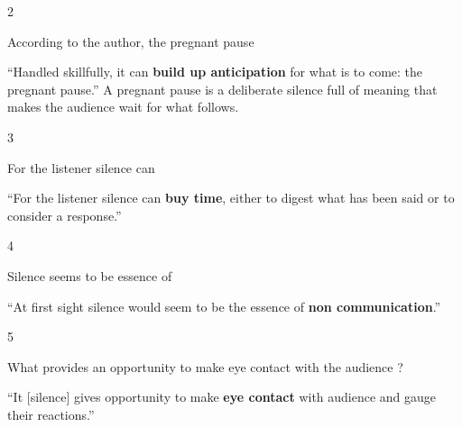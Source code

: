 \begin{question}{2}
{According to the author, the pregnant pause\par}
\begin{explain}
``Handled skillfully, it can \textbf{build up anticipation} for what is to come: the pregnant pause.'' A pregnant pause is a deliberate silence full of meaning that makes the audience wait for what follows.
\end{explain}
\end{question}

\begin{question}{3}
{For the listener silence can\par}
\begin{explain}
``For the listener silence can \textbf{buy time}, either to digest what has been said or to consider a response.''
\end{explain}
\end{question}

\begin{question}{4}
{Silence seems to be essence of\par}
\begin{explain}
``At first sight silence would seem to be the essence of \textbf{non communication}.''
\end{explain}
\end{question}

\begin{question}{5}
{What provides an opportunity to make eye contact with the audience ?\par}
\begin{explain}
``It [silence] gives opportunity to make \textbf{eye contact} with audience and gauge their reactions.''
\end{explain}
\end{question}

